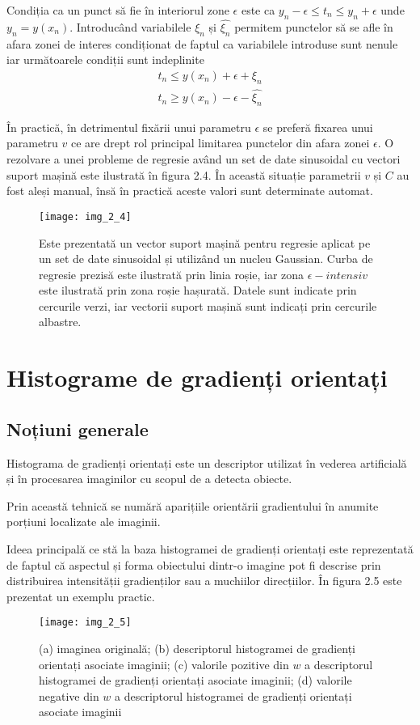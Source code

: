Condiția ca un punct să fie în interiorul zone $ \epsilon $ este ca $y_n - \epsilon \leq t_n \leq y_n + \epsilon$ unde $y_n = y(x_n)$. Introducând variabilele $\xi_n$ și $\widehat{\xi_n}$ permitem punctelor să se afle în afara zonei de interes condiționat de faptul ca variabilele introduse sunt nenule iar următoarele condiții sunt indeplinite
\begin{align}	
	t_n \leq y(x_n) + \epsilon + \xi_n
\end{align}
\begin{align}	
	t_n \geq y(x_n) - \epsilon - \widehat{\xi_n}
\end{align}

În practică, în detrimentul fixării unui parametru $\epsilon$ se preferă fixarea unui parametru $v$ ce are drept rol principal limitarea punctelor din afara zonei $\epsilon$. O rezolvare a unei probleme de regresie având un set de date sinusoidal cu vectori suport mașină este ilustrată în figura 2.4. În această situație parametrii $v$ și $C$ au fost aleși manual, însă în practică aceste valori sunt determinate automat.
\begin{figure}[!h]
	\centering
	\texttt{[image: img\_2\_4]}
	\caption{Este prezentată un vector suport mașină pentru regresie aplicat pe un set de date sinusoidal și utilizând un nucleu Gaussian. Curba de regresie prezisă este ilustrată prin linia roșie, iar zona $\epsilon - intensiv$ este ilustrată prin zona roșie hașurată. Datele sunt indicate prin cercurile verzi, iar vectorii suport mașină sunt indicați prin cercurile albastre.}
\end{figure}

\section{Histograme de gradienți orientați}

\subsection{Noțiuni generale}

Histograma de gradienți orientați este un descriptor utilizat în vederea artificială și în procesarea imaginilor cu scopul de a detecta obiecte. 

Prin această tehnică se numără aparițiile orientării gradientului în anumite porțiuni localizate ale imaginii.

Ideea principală ce stă la baza histogramei de gradienți orientați este reprezentată de faptul că aspectul și forma obiectului dintr-o imagine pot fi descrise prin distribuirea intensității gradienților  sau a muchiilor direcțiilor. În figura 2.5 este prezentat un exemplu practic.
\begin{figure}[!h]
	\centering
	\texttt{[image: img\_2\_5]}
	\caption{(a) imaginea originală; (b) descriptorul histogramei de gradienți orientați asociate imaginii; (c) valorile pozitive din $w$ a descriptorul histogramei de gradienți orientați asociate imaginii; (d) valorile negative din $w$ a descriptorul histogramei de gradienți orientați asociate imaginii}
\end{figure}

